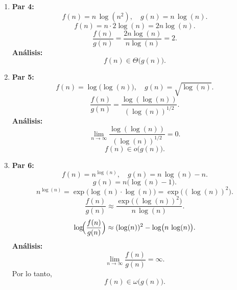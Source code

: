 \documentclass[12pt]{article}
\begin{document}
\begin{enumerate}
  \item \textbf{Par 4:} 
  \[
    f(n) = n \,\log(n^2), \quad g(n) = n \,\log(n).
  \]
  \[
    f(n) = n \cdot 2\log(n)= 2n\log(n).
  \]
  \[
    \frac{f(n)}{g(n)} = \frac{2n\log(n)}{n\log(n)} = 2.
  \]
  \textbf{Análisis:}
  \[
    f(n) \in \Theta\bigl(g(n)\bigr).
  \]

  \item \textbf{Par 5:}
  \[
    f(n) = \log\bigl(\log(n)\bigr), \quad g(n) = \sqrt{\log(n)}.
  \]
  \[
    \frac{f(n)}{g(n)} = \frac{\log(\log(n))}{(\log(n))^{1/2}}.
  \]
  \textbf{Análisis:}
  \[
    \lim_{n \to \infty} \frac{\log(\log(n))}{(\log(n))^{1/2}} = 0.
  \]
  \[
    f(n) \in o\bigl(g(n)\bigr).
  \]

  \item \textbf{Par 6:}
  \[
    f(n) = n^{\log(n)}, \quad g(n) = n \,\log(n) - n.
  \]
  \[
    g(n) = n\bigl(\log(n)-1\bigr).
  \]
  \[
    n^{\log(n)} = \exp\bigl(\log(n)\cdot\log(n)\bigr)= \exp\bigl((\log(n))^2\bigr).
  \]
  \[
    \frac{f(n)}{g(n)} \approx \frac{\exp\bigl((\log(n))^2\bigr)}{n\,\log(n)}.
  \]
  \[
    \log\!\Bigl(\frac{f(n)}{g(n)}\Bigr) \approx (\log(n))^2 - \log\bigl(n\,\log(n)\bigr).
  \]
  \textbf{Análisis:}
  \[
    \lim_{n\to\infty} \frac{f(n)}{g(n)} = \infty.
  \]
  Por lo tanto,
  \[
    f(n) \in \omega\bigl(g(n)\bigr).
  \]


\end{enumerate}
\end{document}
